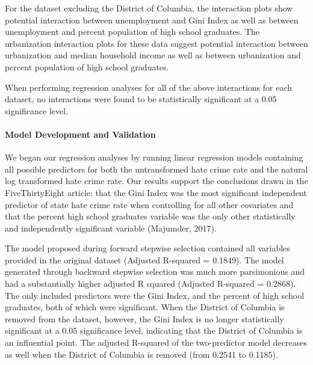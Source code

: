 \documentclass[
]{article}
\begin{document}
For the dataset excluding the District of Columbia, the interaction
plots show potential interaction between unemployment and Gini Index as
well as between unemployment and percent population of high school
graduates. The urbanization interaction plots for these data suggest
potential interaction between urbanization and median household income
as well as between urbanization and percent population of high school
graduates.

When performing regression analyses for all of the above interactions
for each dataset, no interactions were found to be statistically
significant at a 0.05 significance level.

\hypertarget{model-development-and-validation-1}{%
\paragraph{Model Development and
Validation}\label{model-development-and-validation-1}}

We began our regression analyses by running linear regression models
containing all possible predictors for both the untransformed hate crime
rate and the natural log transformed hate crime rate. Our results
support the conclusions drawn in the FiveThirtyEight article: that the
Gini Index was the most significant independent predictor of state hate
crime rate when controlling for all other covariates and that the
percent high school graduates variable was the only other statistically
and independently significant variable (Majumder, 2017).

The model proposed during forward stepwise selection contained all
variables provided in the original dataset (Adjusted R-squared =
0.1849). The model generated through backward stepwise selection was
much more parsimonious and had a substantially higher adjusted R squared
(Adjusted R-squared = 0.2868). The only included predictors were the
Gini Index, and the percent of high school graduates, both of which were
significant. When the District of Columbia is removed from the dataset,
however, the Gini Index is no longer statistically significant at a 0.05
significance level, indicating that the District of Columbia is an
influential point. The adjusted R-squared of the two-predictor model
decreases as well when the District of Columbia is removed (from 0.2541
to 0.1185).
\end{document}
